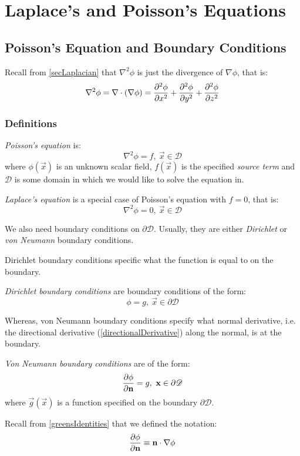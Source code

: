 \documentclass[../main.tex]{subfiles}
\begin{document}
\chapter{Laplace's and Poisson's Equations}
\label{chapter7}
\section{Poisson's Equation and Boundary Conditions}
\begin{remark}[Recap]
  Recall from \cref{secLaplacian} that $\nabla^2 \phi$ is just the divergence of $\nabla \phi$, that is:
  \[
    \nabla^2 \phi = \nabla \cdot (\nabla \phi) = \pderiv[2]{\phi}{x} + \pderiv[2]{\phi}{y} + \pderiv[2]{\phi}{z}
  \]
\end{remark}
\subsection{Definitions}
\begin{definition}
  \textit{Poisson's equation} is:
  \label{poissonsEquation}
  \[
    \nabla^2 \phi = f,\ \vec{x} \in \mathscr{D}
  \]
  where $\phi(\vec{x})$ is an unknown scalar field, $f(\vec{x})$ is the specified \textit{source term} and $\mathscr{D}$ is some domain in which we would like to solve the equation in.
\end{definition}
\begin{definition}
  \textit{Laplace's equation} is a special case of Poisson's equation with $f = 0$, that is:
  \label{laplacesEquation}
  \[
    \nabla^2 \phi = 0,\ \vec{x} \in \mathscr{D}
  \]
\end{definition}
We also need boundary conditions on $\partial \mathscr{D}$.
Usually, they are either \textit{Dirichlet} or \textit{von Neumann} boundary conditions.

Dirichlet boundary conditions specific what the function is equal to on the boundary.
\begin{definition}
  \textit{Dirichlet boundary conditions} are boundary conditions of the form:
  \[
    \phi = g,\ \vec{x} \in \partial \mathscr{D}
  \]
\end{definition}
Whereas, von Neumann boundary conditions specify what normal derivative, i.e. the directional derivative (\cref{directionalDerivative}) along the normal, is at the boundary.
\begin{definition}
  \textit{Von Neumann boundary conditions} are of the form:
  \[
    \pderiv{\phi}{\vec{n}} = g,\ \vec{x} \in \partial\mathscr{D}
  \]
  where $\vec{g}(\vec{x})$ is a function specified on the boundary $\partial \mathscr{D}$.
\end{definition}
\begin{remark}[Notation]
  Recall from \cref{greensIdentities} that we defined the notation:
  \[
    \pderiv{\phi}{\vec{n}} \equiv \vec{n} \cdot \nabla \phi
  \]
\end{remark}
\end{document}
